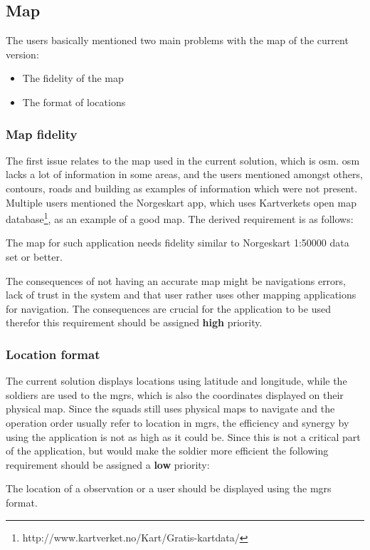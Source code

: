 \subsection{Map}
The users basically mentioned two main problems with the map of the current version: 
\begin{itemize}
	\item{The fidelity of the map}
	\item{The format of locations}
\end{itemize}
\subsubsection{Map fidelity}
The first issue relates to the map used in the current solution, which is \gls{osm}. \gls{osm} lacks a lot of information in some areas, and the users mentioned amongst others, contours, roads and building as examples of information which were not present. Multiple users mentioned the Norgeskart app, which uses Kartverkets open map database\footnote{http://www.kartverket.no/Kart/Gratis-kartdata/}, as an example of a good map.
The derived requirement is as follows:
\begin{requirement}
The map for such application needs fidelity similar to Norgeskart 1:50000 data set or better.
\end{requirement}

The consequences of not having an accurate map might be navigations errors, lack of trust in the system and that user rather uses other mapping applications for navigation. The consequences are crucial for the application to be used therefor this requirement should be assigned \textbf{high} priority. 

\subsubsection{Location format}
The current solution displays locations using latitude and longitude, while the soldiers are used to the \gls{mgrs}, which is also the coordinates displayed on their physical map. Since the squads still uses physical maps to navigate and the operation order usually refer to location in \gls{mgrs}, the efficiency and synergy by using the application is not as high as it could be. Since this is not a critical part of the application, but would make the soldier more efficient the following requirement should be assigned a \textbf{low} priority:
\begin{requirement}
The location of a observation or a user should be displayed using the \gls{mgrs} format. 
\end{requirement}

